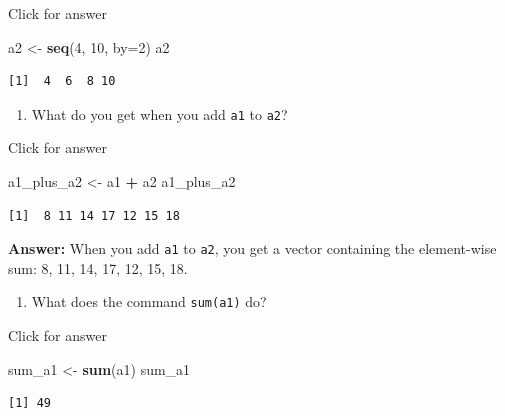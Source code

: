 \documentclass[
]{book}
\newenvironment{Shaded}{\begin{snugshade}}{\end{snugshade}}
\newcommand{\AttributeTok}[1]{\textcolor[rgb]{0.13,0.29,0.53}{#1}}
\newcommand{\DecValTok}[1]{\textcolor[rgb]{0.00,0.00,0.81}{#1}}
\newcommand{\FunctionTok}[1]{\textcolor[rgb]{0.13,0.29,0.53}{\textbf{#1}}}
\newcommand{\NormalTok}[1]{#1}
\newcommand{\OtherTok}[1]{\textcolor[rgb]{0.56,0.35,0.01}{#1}}
\newcommand{\SpecialCharTok}[1]{\textcolor[rgb]{0.81,0.36,0.00}{\textbf{#1}}}
\providecommand{\tightlist}{%
  \setlength{\itemsep}{0pt}\setlength{\parskip}{0pt}}
\begin{document}
Click for answer

\begin{Shaded}
\begin{Highlighting}[]
\NormalTok{a2 }\OtherTok{\textless{}{-}} \FunctionTok{seq}\NormalTok{(}\DecValTok{4}\NormalTok{, }\DecValTok{10}\NormalTok{, }\AttributeTok{by=}\DecValTok{2}\NormalTok{)}
\NormalTok{a2}
\end{Highlighting}
\end{Shaded}

\begin{verbatim}
[1]  4  6  8 10
\end{verbatim}

\begin{enumerate}
\def\labelenumi{\alph{enumi}.}
\setcounter{enumi}{2}
\tightlist
\item
  What do you get when you add \texttt{a1} to \texttt{a2}?
\end{enumerate}

Click for answer

\begin{Shaded}
\begin{Highlighting}[]
\NormalTok{a1\_plus\_a2 }\OtherTok{\textless{}{-}}\NormalTok{ a1 }\SpecialCharTok{+}\NormalTok{ a2}
\NormalTok{a1\_plus\_a2}
\end{Highlighting}
\end{Shaded}

\begin{verbatim}
[1]  8 11 14 17 12 15 18
\end{verbatim}

\textbf{Answer:} When you add \texttt{a1} to \texttt{a2}, you get a vector containing the element-wise sum: 8, 11, 14, 17, 12, 15, 18.

\begin{enumerate}
\def\labelenumi{\alph{enumi}.}
\setcounter{enumi}{3}
\tightlist
\item
  What does the command \texttt{sum(a1)} do?
\end{enumerate}

Click for answer

\begin{Shaded}
\begin{Highlighting}[]
\NormalTok{sum\_a1 }\OtherTok{\textless{}{-}} \FunctionTok{sum}\NormalTok{(a1)}
\NormalTok{sum\_a1}
\end{Highlighting}
\end{Shaded}

\begin{verbatim}
[1] 49
\end{verbatim}
\end{document}

